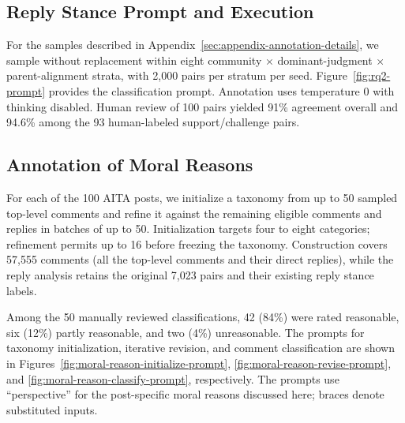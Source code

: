 


\subsection{Reply Stance Prompt and Execution}
\label{sec:supp-response-annotation}

For the samples described in Appendix~\ref{sec:appendix-annotation-details}, we sample without
replacement within eight community $\times$ dominant-judgment
$\times$ parent-alignment strata, with 2,000 pairs per stratum per seed. Figure~\ref{fig:rq2-prompt} provides the classification prompt. Annotation uses temperature 0 with thinking disabled. Human review of 100 pairs yielded 91\% agreement overall and 94.6\% among the 93 human-labeled support/challenge pairs.



\subsection{Annotation of Moral Reasons}
\label{sec:supp-perspective-annotation}

For each of the 100 AITA posts, we initialize a taxonomy from up to
50 sampled top-level comments and refine it against the remaining eligible
comments and replies in batches of up to 50. Initialization targets four to
eight categories; refinement permits up to 16 before freezing the taxonomy.
Construction covers 57,555 comments (all the top-level comments and their direct replies), while the reply analysis retains
the original 7,023 pairs and their existing reply stance labels.

Among the 50 manually reviewed classifications, 42 (84\%) were rated reasonable, six (12\%) partly reasonable, and two (4\%) unreasonable.
The prompts for taxonomy initialization, iterative revision, and comment classification are shown in Figures~\ref{fig:moral-reason-initialize-prompt}, \ref{fig:moral-reason-revise-prompt}, and \ref{fig:moral-reason-classify-prompt}, respectively.
The prompts use ``perspective'' for the post-specific moral reasons discussed here; braces denote substituted inputs.






